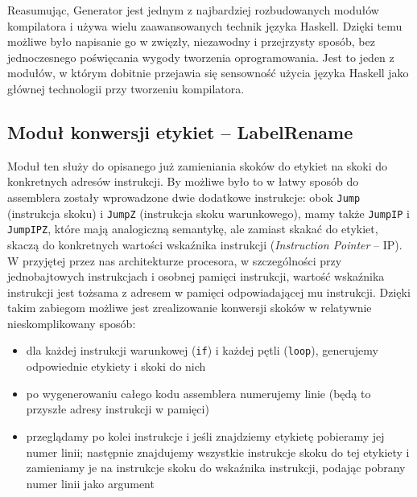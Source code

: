 Reasumując, Generator jest jednym z najbardziej rozbudowanych modułów kompilatora i używa wielu zaawansowanych technik języka Haskell. Dzięki temu możliwe było napisanie go w zwięzły, niezawodny i przejrzysty sposób, bez jednoczesnego poświęcania wygody tworzenia oprogramowania. Jest to jeden z modułów, w którym dobitnie przejawia się sensowność użycia języka Haskell jako głównej technologii przy tworzeniu kompilatora.

\subsection{Moduł konwersji etykiet -- LabelRename}

Moduł ten służy do opisanego już zamieniania skoków do etykiet na skoki do konkretnych adresów instrukcji. By możliwe było to w łatwy sposób do assemblera zostały wprowadzone dwie dodatkowe instrukcje: obok \texttt{Jump} (instrukcja skoku) i \texttt{JumpZ} (instrukcja skoku warunkowego), mamy także \texttt{JumpIP} i \texttt{JumpIPZ}, które mają analogiczną semantykę, ale zamiast skakać do etykiet, skaczą do konkretnych wartości wskaźnika instrukcji (\textit{Instruction Pointer} -- IP). W przyjętej przez nas architekturze procesora, w szczególności przy jednobajtowych instrukcjach i osobnej pamięci instrukcji, wartość wskaźnika instrukcji jest tożsama z adresem w pamięci odpowiadającej mu instrukcji. Dzięki takim zabiegom możliwe jest zrealizowanie konwersji skoków w relatywnie nieskomplikowany sposób:

\begin{itemize}
  \item dla każdej instrukcji warunkowej (\texttt{if}) i każdej pętli (\texttt{loop}), generujemy odpowiednie etykiety i skoki do nich
  \item po wygenerowaniu całego kodu assemblera numerujemy linie (będą to przyszłe adresy instrukcji w pamięci)
  \item przeglądamy po kolei instrukcje i jeśli znajdziemy etykietę pobieramy jej numer linii; następnie znajdujemy wszystkie instrukcje skoku do tej etykiety i zamieniamy je na instrukcje skoku do wskaźnika instrukcji, podając pobrany numer linii jako argument
\end{itemize}

